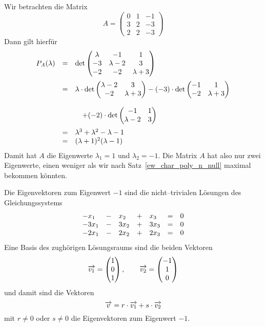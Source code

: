 \begin{beispiel}\label{ew_doppelt} Wir betrachten die Matrix
  	$$ A = \left( \begin{matrix} 0 & 1 & - 1 \\ 3 & 2 & - 3 \\ 2 & 2 & - 3 \end{matrix} \right) $$
Dann gilt hierfür
  	$$ \begin{array} {l c l}
  	P_A(\lambda) & = & \det{\begin{matrix} \lambda & -1 & 1 \\ 
    	-3 & \lambda - 2 & 3 \\ - 2 & -2 & \lambda + 3 \end{matrix} } \\
  	& = & \lambda \cdot \det{\begin{matrix} \lambda - 2 & 3 \\
   	-2 & \lambda + 3 \end{matrix} } - (-3) \cdot \det{\begin{matrix} 
 	- 1 & 1 \\ -2 & \lambda + 3 \end{matrix} } \\
  	& & \quad  + (-2) \cdot 
   	\det{\begin{matrix} -1 & 1 \\ \lambda - 2 & 3 \end{matrix} } \\
  	& = & \lambda^3 + \lambda^2 - \lambda - 1 \\
  	& = & (\lambda+1)^2(\lambda-1)
  	\end{array} $$
Damit hat $A$ die Eigenwerte $\lambda_1 = 1$ und $\lambda_2 = -1$. Die Matrix $A$ 
hat also nur zwei Eigenwerte, einen weniger als wir nach Satz~\ref{ew_char_poly_n_null} 
maximal bekommen könnten.  

Die Eigenvektoren zum Eigenwert $-1$ sind die nicht--trivialen Lösungen des 
Gleichungssystems
  	$$ \begin{array} {l c l c l c l}
 	-x_1 & - & x_2 & + & x_3 & = & 0 \\
 	-3x_1 & - & 3x_2 & + & 3x_3 & = & 0 \\
 	-2x_1 & - & 2x_2 & + & 2x_3 & = & 0 
  	\end{array} $$
Eine Basis des zughörigen Lösungsraums sind die beiden Vektoren
  	$$ \overrightarrow{v_1} = \left( \begin{matrix} 1 \\ 0 \\ 1 \end{matrix} \right), 
  	\qquad \overrightarrow{v_2} = \left( \begin{matrix} -1 \\ 1 \\ 0 \end{matrix} 
  	\right) $$
und damit sind die Vektoren 
  	$$ \overrightarrow{v} = r \cdot \overrightarrow{v_1} + s \cdot \overrightarrow{v_2} $$
mit $r \neq 0$ oder $s \neq 0$ die Eigenvektoren zum Eigenwert $-1$.


\end{beispiel}
